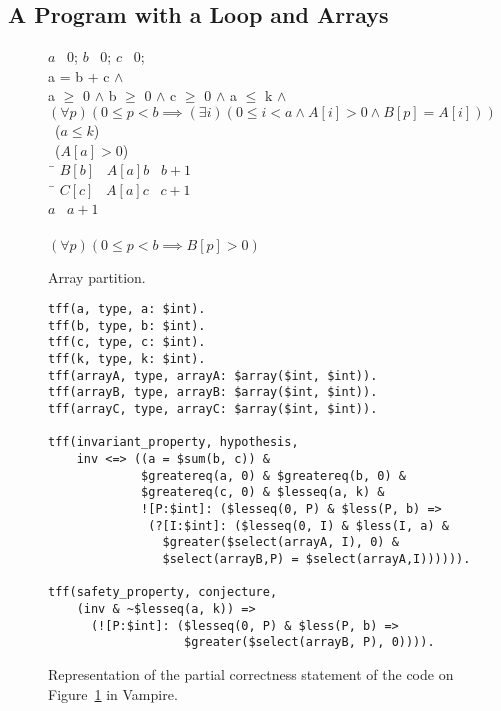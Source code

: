\subsection{A Program with a Loop and Arrays}

\begin{figure*}[bt]
{
  \begin{center}
    \parbox{0cm}{
  \begin{tabbing}
    $a$ \ass\ $0$; $b$ \ass\ $0$; $c$ \ass\ $0$; \\[.5em]
     a = b + c $\wedge$ \\
    {\color{white}} a $\geq$ 0 $\wedge$ b $\geq$ 0 $\wedge$ c $\geq$
    0 $\wedge$ a $\leq$ k $\wedge$ \\
    {\color{white}} $(\forall p) (0\leq p<b \implies
    (\exists i) (0 \leq i < a \wedge A[i] > 0 \wedge B[p] = A[i]))$\\[1em]
    \WHILE\ ($a \leq k$) \DO \\ \inc
      \IF\ ($A[a] > 0$) \\ \inc
        \THEN\ \=\+ $B[b]$ \ass\ $A[a]$\semicol $b$ \ass\ $b+1$\semicol \\ \dec
        \ELSE\ \=\+ $C[c]$ \ass\ $A[a]$\semicol $c$ \ass\ $c+1$\semicol \\ \dec \dec
      $a$ \ass\ $a+1$\semicol \\ \dec
    \OD\\[.5em]
     $(\forall p)(0 \leq p<b \implies B[p]> 0)$
  \end{tabbing}
    }
  \end{center}
  \caption{Array partition.\label{fig:partition}}
}
\end{figure*}

\begin{figure*}[tb]
\begin{lstlisting}[language=tptp]
tff(a, type, a: $int).
tff(b, type, b: $int).
tff(c, type, c: $int).
tff(k, type, k: $int).
tff(arrayA, type, arrayA: $array($int, $int)).
tff(arrayB, type, arrayB: $array($int, $int)).
tff(arrayC, type, arrayC: $array($int, $int)).

tff(invariant_property, hypothesis,
    inv <=> ((a = $sum(b, c)) &
             $greatereq(a, 0) & $greatereq(b, 0) &
             $greatereq(c, 0) & $lesseq(a, k) &
             ![P:$int]: ($lesseq(0, P) & $less(P, b) =>
              (?[I:$int]: ($lesseq(0, I) & $less(I, a) &
                $greater($select(arrayA, I), 0) &
                $select(arrayB,P) = $select(arrayA,I)))))).

tff(safety_property, conjecture,
    (inv & ~$lesseq(a, k)) =>
      (![P:$int]: ($lesseq(0, P) & $less(P, b) =>
                   $greater($select(arrayB, P), 0)))).
\end{lstlisting}
\caption{Representation of the partial correctness statement of the code on Figure~\ref{fig:partition} in Vampire\label{fig:loop_safety_Vampire}.}
\end{figure*}

